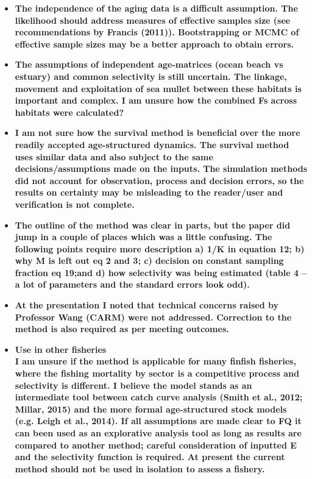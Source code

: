 \documentclass[11pt]{article}
\begin{document}
\begin{spacing}{1.2}
\begin{itemize}
\item {\bf The independence of the aging data is a difficult assumption. The likelihood should address measures of effective samples size (see recommendations by Francis (2011)). Bootstrapping or MCMC of effective sample sizes may be a better approach to obtain errors.}

\item {\bf The assumptions of independent age-matrices (ocean beach vs estuary) and common selectivity is still uncertain. The linkage, movement and exploitation of sea mullet between these habitats is important and complex. I am unsure how the combined Fs across habitats were calculated?}

\item {\bf I am not sure how the survival method is beneficial over the more readily accepted age-structured dynamics. The survival method uses similar data and also subject to the same decisions/assumptions made on the inputs. The simulation methods did not account for observation, process and decision errors, so the results on certainty may be misleading to the reader/user and verification is not complete.}

\item {\bf The outline of the method was clear in parts, but the paper did jump in a couple of places which was a little confusing. The following points require more description a) 1/K in equation 12; b) why M is left out eq 2 and 3; c) decision on constant sampling fraction eq 19;and d) how selectivity was being estimated (table 4 – a lot of parameters and the standard errors look odd).}

\item {\bf At the presentation I noted that technical concerns raised by Professor Wang (CARM) were not addressed. Correction to the method is also required as per meeting outcomes.} 

\item {\bf Use in other fisheries \\

 I am unsure if the method is applicable for many finfish fisheries, where the fishing mortality by sector is a competitive process and selectivity is different. I believe the model stands as an intermediate tool between catch curve analysis (Smith et al., 2012; Millar, 2015) and the more formal age-structured stock models (e.g. Leigh et al., 2014). If all assumptions are made clear to FQ it can been used as an explorative analysis tool as long as results are compared to another method; careful consideration of inputted E and the selectivity function is required. At present the current method should not be used in isolation to assess a fishery.}


\end{itemize}
\end{spacing}
\end{document}
